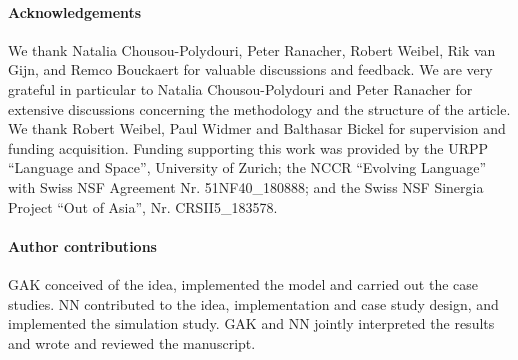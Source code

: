 \documentclass[]{rsos}%
\begin{document}
\paragraph{Acknowledgements}
We thank  Natalia Chousou-Polydouri, Peter Ranacher, Robert Weibel, Rik van Gijn, and Remco Bouckaert
for valuable discussions and feedback. We are very grateful in particular to Natalia Chousou-Polydouri and Peter Ranacher for extensive discussions concerning the methodology and the structure of the article.
We thank Robert Weibel, Paul Widmer and Balthasar Bickel for supervision and funding acquisition.
Funding supporting this work was provided by the
URPP “Language and Space”, University of Zurich; the NCCR “Evolving Language” with Swiss
NSF Agreement Nr. 51NF40\_180888; and the Swiss NSF Sinergia Project “Out of Asia”, Nr. CRSII5\_183578.

\paragraph{Author contributions}
GAK conceived of the idea, implemented the model and carried out the case studies. NN contributed to the idea, implementation and case study design, and implemented the simulation study. GAK and NN jointly interpreted the results and wrote and reviewed the manuscript.


\printbibliography{}
\end{document}
